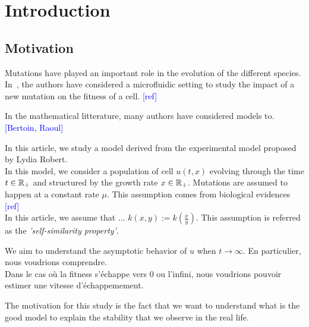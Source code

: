 \documentclass[11pt]{amsart}
\newcommand{\ndr}[1]{\textcolor{blue}{[#1]}}
\begin{document}




\section{Introduction}

\subsection{Motivation}
Mutations have played an important role in the evolution of the different species. In~\cite{robert2018mutation}, the authors have considered a microfluidic setting to study the impact of a new mutation on the fitness of a cell. \ndr{ref}


\medskip
In the mathematical litterature, many authors have considered models to. 
\ndr{Bertoin, Raoul}

\medskip

In this article, we study a model derived from the experimental model proposed by Lydia Robert. \\ 

In this model, we consider a population of cell $u(t,x)$ evolving through the time $t \in \mathbb{R}_+$ and structured by the growth rate $x \in \mathbb{R}_+$.  
Mutations are assumed to happen at a constant rate $\mu$. This assumption comes from biological evidences \ndr{ref} \\

In this article, we assume that ...
$k(x,y) := k(\frac{x}{y})$. This assumption is referred as the \textit{'self-similarity property'}. 

We aim to understand the asymptotic behavior of $u$ when $t \to \infty$. En particulier, nous voudrions comprendre. \\
Dans le cas où la fitness s'échappe vers 0 ou l'infini, nous voudrions pouvoir estimer une vitesse d'échappemement. 

The motivation for this study is the fact that we want to understand what is the good model to explain the stability that we observe in the real life. 
\end{document}
